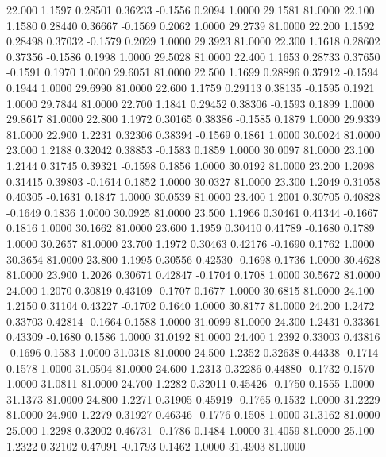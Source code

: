   22.000   1.1597   0.28501   0.36233  -0.1556   0.2094   1.0000  29.1581  81.0000
  22.100   1.1580   0.28440   0.36667  -0.1569   0.2062   1.0000  29.2739  81.0000
  22.200   1.1592   0.28498   0.37032  -0.1579   0.2029   1.0000  29.3923  81.0000
  22.300   1.1618   0.28602   0.37356  -0.1586   0.1998   1.0000  29.5028  81.0000
  22.400   1.1653   0.28733   0.37650  -0.1591   0.1970   1.0000  29.6051  81.0000
  22.500   1.1699   0.28896   0.37912  -0.1594   0.1944   1.0000  29.6990  81.0000
  22.600   1.1759   0.29113   0.38135  -0.1595   0.1921   1.0000  29.7844  81.0000
  22.700   1.1841   0.29452   0.38306  -0.1593   0.1899   1.0000  29.8617  81.0000
  22.800   1.1972   0.30165   0.38386  -0.1585   0.1879   1.0000  29.9339  81.0000
  22.900   1.2231   0.32306   0.38394  -0.1569   0.1861   1.0000  30.0024  81.0000
  23.000   1.2188   0.32042   0.38853  -0.1583   0.1859   1.0000  30.0097  81.0000
  23.100   1.2144   0.31745   0.39321  -0.1598   0.1856   1.0000  30.0192  81.0000
  23.200   1.2098   0.31415   0.39803  -0.1614   0.1852   1.0000  30.0327  81.0000
  23.300   1.2049   0.31058   0.40305  -0.1631   0.1847   1.0000  30.0539  81.0000
  23.400   1.2001   0.30705   0.40828  -0.1649   0.1836   1.0000  30.0925  81.0000
  23.500   1.1966   0.30461   0.41344  -0.1667   0.1816   1.0000  30.1662  81.0000
  23.600   1.1959   0.30410   0.41789  -0.1680   0.1789   1.0000  30.2657  81.0000
  23.700   1.1972   0.30463   0.42176  -0.1690   0.1762   1.0000  30.3654  81.0000
  23.800   1.1995   0.30556   0.42530  -0.1698   0.1736   1.0000  30.4628  81.0000
  23.900   1.2026   0.30671   0.42847  -0.1704   0.1708   1.0000  30.5672  81.0000
  24.000   1.2070   0.30819   0.43109  -0.1707   0.1677   1.0000  30.6815  81.0000
  24.100   1.2150   0.31104   0.43227  -0.1702   0.1640   1.0000  30.8177  81.0000
  24.200   1.2472   0.33703   0.42814  -0.1664   0.1588   1.0000  31.0099  81.0000
  24.300   1.2431   0.33361   0.43309  -0.1680   0.1586   1.0000  31.0192  81.0000
  24.400   1.2392   0.33003   0.43816  -0.1696   0.1583   1.0000  31.0318  81.0000
  24.500   1.2352   0.32638   0.44338  -0.1714   0.1578   1.0000  31.0504  81.0000
  24.600   1.2313   0.32286   0.44880  -0.1732   0.1570   1.0000  31.0811  81.0000
  24.700   1.2282   0.32011   0.45426  -0.1750   0.1555   1.0000  31.1373  81.0000
  24.800   1.2271   0.31905   0.45919  -0.1765   0.1532   1.0000  31.2229  81.0000
  24.900   1.2279   0.31927   0.46346  -0.1776   0.1508   1.0000  31.3162  81.0000
  25.000   1.2298   0.32002   0.46731  -0.1786   0.1484   1.0000  31.4059  81.0000
  25.100   1.2322   0.32102   0.47091  -0.1793   0.1462   1.0000  31.4903  81.0000
